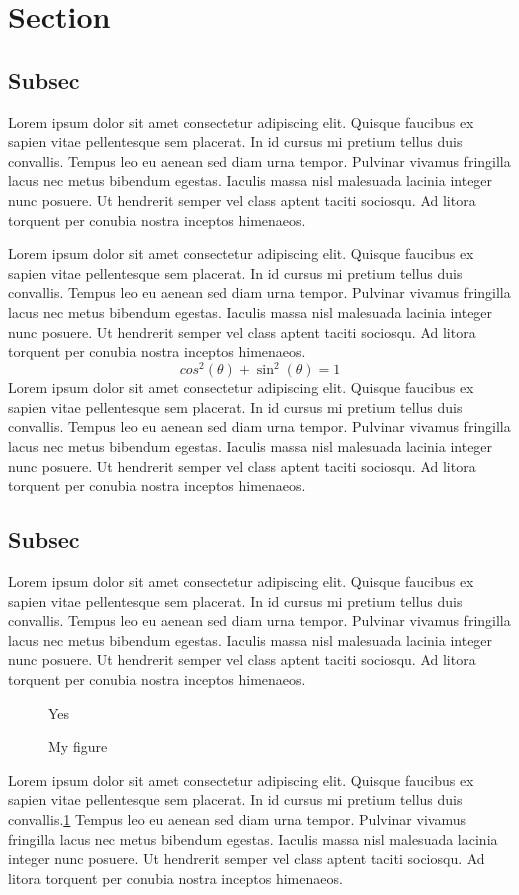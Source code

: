 \section{Section}
\subsection{Subsec}\label{sec:third}
Lorem ipsum dolor sit amet consectetur adipiscing elit. Quisque
faucibus ex sapien vitae pellentesque sem placerat. In id cursus mi
pretium tellus duis convallis. Tempus leo eu aenean sed diam urna
tempor. Pulvinar vivamus fringilla lacus nec metus bibendum egestas.
Iaculis massa nisl malesuada lacinia integer nunc posuere. Ut
hendrerit semper vel class aptent taciti sociosqu. Ad litora torquent
per conubia nostra inceptos himenaeos.

Lorem ipsum dolor sit amet consectetur adipiscing elit. Quisque
faucibus ex sapien vitae pellentesque sem placerat. In id cursus mi
pretium tellus duis convallis. Tempus leo eu aenean sed diam urna
tempor. Pulvinar vivamus fringilla lacus nec metus bibendum egestas.
Iaculis massa nisl malesuada lacinia integer nunc posuere. Ut
hendrerit semper vel class aptent taciti sociosqu. Ad litora torquent
per conubia nostra inceptos himenaeos.
\begin{equation}
  \label{eq:equation}
  cos^{2}(\theta) + \sin^{2}(\theta) =1
\end{equation}
Lorem ipsum dolor sit amet consectetur adipiscing elit. Quisque
faucibus ex sapien vitae pellentesque sem placerat. In id cursus mi
pretium tellus duis convallis. Tempus leo eu aenean sed diam urna
tempor. Pulvinar vivamus fringilla lacus nec metus bibendum egestas.
Iaculis massa nisl malesuada lacinia integer nunc posuere. Ut
hendrerit semper vel class aptent taciti sociosqu. Ad litora torquent
per conubia nostra inceptos himenaeos.
\subsection{Subsec}\label{sec:fourth}
Lorem ipsum dolor sit amet consectetur adipiscing elit. Quisque
faucibus ex sapien vitae pellentesque sem placerat. In id cursus mi
pretium tellus duis convallis. Tempus leo eu aenean sed diam urna
tempor. Pulvinar vivamus fringilla lacus nec metus bibendum egestas.
Iaculis massa nisl malesuada lacinia integer nunc posuere. Ut
hendrerit semper vel class aptent taciti sociosqu. Ad litora torquent
per conubia nostra inceptos himenaeos.
\begin{figure}[h]
  \centering
  \mbox{Yes}
  \caption{My figure}
  \label{fig:figure1}
\end{figure}
Lorem ipsum dolor sit amet consectetur adipiscing elit. Quisque
faucibus ex sapien vitae pellentesque sem placerat. In id cursus mi
pretium tellus duis convallis.\ref{fig:figure1} Tempus leo eu aenean
sed diam urna tempor. Pulvinar vivamus fringilla lacus nec metus
bibendum egestas. Iaculis massa nisl malesuada lacinia integer nunc
posuere. Ut hendrerit semper vel class aptent taciti sociosqu. Ad
litora torquent per conubia nostra inceptos himenaeos.
